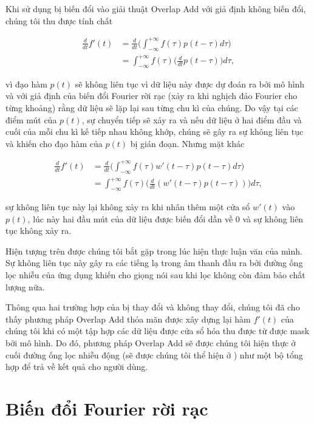 		Khi sử dụng \spectrogram{} bị biến đổi vào giải thuật Overlap Add với giả định \spectrogram{} không biến đổi, chúng tôi thu được tính chất
		
			\begin{align*}
				\frac{d}{dt} f'(t)	& = \frac{d}{dt} \bigg( \int_{-\infty}^{+\infty} f(\tau) p(t - \tau) d\tau \bigg) \\
									& = \int_{-\infty}^{+\infty} f(\tau) \bigg( \frac{d}{dt} p(t - \tau) \bigg) d\tau,
			\end{align*}
		
		\noindent vì đạo hàm $p(t)$ sẽ không liên tục vì dữ liệu này được dự đoán ra bởi mô hình và với giả định của biến đổi Fourier rời rạc (xảy ra khi nghịch đảo Fourier cho từng khoảng) rằng dữ liệu sẽ lặp lại sau từng chu kì của chúng. Do vậy tại các điểm mút của $p(t)$, sự chuyển tiếp sẽ xảy ra và nếu dữ liệu ở hai điểm đầu và cuối của mỗi chu kì kế tiếp nhau không khớp, chúng sẽ gây ra sự không liên tục và khiến cho đạo hàm của $p(t)$ bị gián đoạn. Nhưng mặt khác
		
			\begin{align*}
				\frac{d}{dt} f'(t)	& = \frac{d}{dt} \bigg( \int_{-\infty}^{+\infty} f(\tau) w'(t - \tau) p(t - \tau) d\tau \bigg) \\
									& = \int_{-\infty}^{+\infty} f(\tau) \bigg( \frac{d}{dt} (w'(t - \tau) p(t - \tau)) \bigg) d\tau,
			\end{align*}
		
		\noindent sự không liên tục này lại không xảy ra khi nhân thêm một cửa sổ $w'(t)$ vào $p(t)$, lúc này hai đầu mút của dữ liệu được biến đổi dần về $0$ và sự không liên tục không xảy ra. 
		
		Hiện tượng trên được chúng tôi bắt gặp trong lúc hiện thực luận văn của mình. Sự không liên tục này gây ra các tiếng lạ trong âm thanh đầu ra bởi đường ống lọc nhiễu của ứng dụng khiến cho giọng nói sau khi lọc không còn đảm bảo chất lượng nữa.
		
		Thông qua hai trường hợp của \spectrogram{} bị thay đổi và \spectrogram{} không thay đổi, chúng tôi đã cho thấy phương pháp Overlap Add thỏa mãn được xây dựng lại hàm $f'(t)$ của chúng tôi khi có một tập hợp các dữ liệu được cửa sổ hóa thu được từ \spectrogram{} được mask bởi mô hình. Do đó, phương pháp Overlap Add sẽ được chúng tôi hiện thực ở cuối đường ống lọc nhiễu động (sẽ được chúng tôi thể hiện ở ) như một bộ tổng hợp để trả về kết quả cho người dùng.
		
	\section{Biến đổi Fourier rời rạc}\label{section::signal_processing::dft}
		
